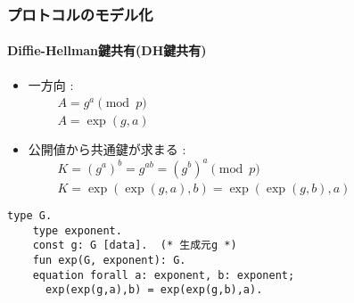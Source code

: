 \documentclass[dvipdfmx, dvipsnames, 11pt]{beamer}
\begin{document}
\begin{frame}[fragile]
  \frametitle{プロトコルのモデル化}
  \framesubtitle{Diffie-Hellman鍵共有(DH鍵共有)}

  \begin{itemize}
    \item 一方向 :
      \\~~~~ {\color{gray}$A = g^{a} \pmod{p}$}
      \\~~~~ $A = \exp(g, a)$
    \item 公開値から共通鍵が求まる :
      \\~~~~ {\color{gray}$K = (g^a)^b = g^{ab} = (g^b)^a \pmod{p}$}
      \\~~~~ $K = \exp(\exp(g,a),b) = \exp(\exp(g,b),a)$
  \end{itemize}

  \vspace{-1em}
  \begin{center}
  \end{center}
  \vspace{-2.5em}

  \begin{lstlisting}[basicstyle=\ttfamily\footnotesize]
    type G.
    type exponent.
    const g: G [data].  (* 生成元g *)
    fun exp(G, exponent): G.
    equation forall a: exponent, b: exponent;
      exp(exp(g,a),b) = exp(exp(g,b),a).
  \end{lstlisting}
\end{frame}
\end{document}
